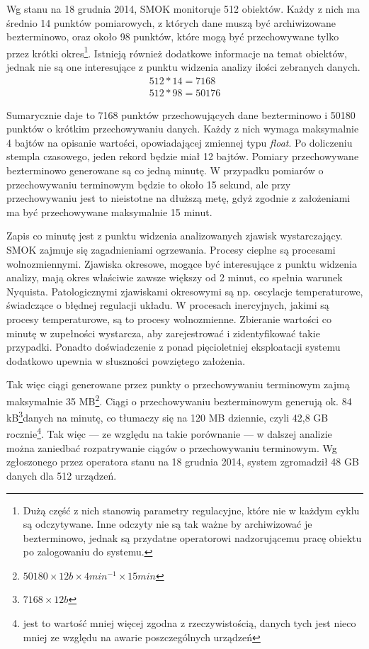 \documentclass[a4paper,polish,12pt,twoside]{article}
\begin{document}
Wg stanu na 18 grudnia 2014, SMOK monitoruje 512 obiektów. Każdy z nich ma średnio 14 punktów pomiarowych, z których dane muszą być archiwizowane bezterminowo, oraz około 98 punktów, które mogą być przechowywane tylko przez krótki okres\footnote{Dużą część z nich stanowią parametry regulacyjne, które nie w każdym cyklu są odczytywane. Inne odczyty nie są tak ważne by archiwizować je bezterminowo, jednak są przydatne operatorowi nadzorującemu pracę obiektu po zalogowaniu do systemu.}. Istnieją również dodatkowe informacje na temat obiektów, jednak nie są one interesujące z punktu widzenia analizy ilości zebranych danych.
\begin{align*}
	512 * 14 = 7168	\\
	512 * 98 = 50176
\end{align*}	

Sumarycznie daje to 7168 punktów przechowujących dane bezterminowo i 50180 punktów o krótkim przechowywaniu danych. Każdy z nich wymaga maksymalnie 4 bajtów na opisanie wartości, opowiadającej zmiennej typu \textit{float}. Po doliczeniu stempla czasowego, jeden rekord będzie miał 12 bajtów. Pomiary przechowywane bezterminowo generowane są co jedną minutę. W przypadku pomiarów o przechowywaniu terminowym będzie to około 15 sekund, ale przy przechowywaniu jest to nieistotne na dłuższą metę, gdyż zgodnie z założeniami ma być przechowywane maksymalnie 15 minut. 

Zapis co minutę jest z punktu widzenia analizowanych zjawisk wystarczający. SMOK zajmuje się zagadnieniami ogrzewania. Procesy cieplne są procesami wolnozmiennymi. Zjawiska okresowe, mogące być interesujące z punktu widzenia analizy, mają okres właściwie zawsze większy od 2 minut, co spełnia warunek Nyquista. Patologicznymi zjawiskami okresowymi są np. oscylacje temperaturowe, świadczące o błędnej regulacji układu. W procesach inercyjnych, jakimi są procesy temperaturowe, są to procesy wolnozmienne. Zbieranie wartości co minutę w zupełności wystarcza, aby zarejestrować i zidentyfikować takie przypadki. Ponadto doświadczenie z ponad pięcioletniej eksploatacji systemu dodatkowo upewnia w słuszności powziętego założenia.

Tak więc ciągi generowane przez punkty o przechowywaniu terminowym zajmą maksymalnie 35 MB\footnote{$50180 \times 12 b \times 4 min^{-1} \times 15 min$}. Ciągi o przechowywaniu bezterminowym generują ok. 84 kB\footnote{$7168 \times 12b$}danych na minutę, co tłumaczy się na 120 MB dziennie, czyli 42,8 GB rocznie\footnote{jest to wartość mniej więcej zgodna z rzeczywistością, danych tych jest nieco mniej ze względu na awarie poszczególnych urządzeń}.  Tak więc --- ze względu na takie porównanie --- w dalszej analizie można zaniedbać rozpatrywanie ciągów o przechowywaniu terminowym. Wg zgłoszonego przez operatora stanu na 18 grudnia 2014, system zgromadził 48 GB danych dla 512 urządzeń.
\end{document}
